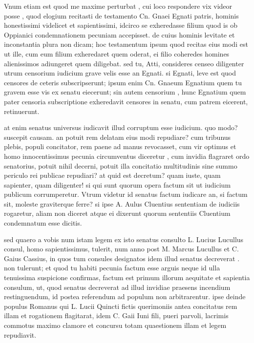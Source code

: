  Vnum etiam est quod me maxime perturbat , cui loco respondere vix videor posse , quod elogium recitasti de testamento Cn. Gnaei Egnati patris, hominis honestissimi videlicet et sapientissimi, idcirco se exheredasse filium quod is ob Oppianici condemnationem pecuniam accepisset. de cuius hominis levitate et inconstantia plura non dicam; hoc testamentum ipsum quod recitas eius modi est ut ille, cum eum filium exheredaret quem oderat, ei filio coheredes homines alienissimos adiungeret quem diligebat. sed tu, Atti, consideres censeo diligenter utrum censorium iudicium grave velis esse an Egnati. si Egnati, leve est quod censores de ceteris subscripserunt; ipsum enim Cn. Gnaeum Egnatium quem tu gravem esse vis ex senatu eiecerunt; sin autem censorium , hunc Egnatium quem pater censoria subscriptione exheredavit censores in senatu, cum patrem eicerent, retinuerunt.

 at enim senatus universus iudicavit illud corruptum esse iudicium. quo modo? suscepit causam. an potuit rem delatam eius modi repudiare? cum tribunus plebis, populi concitator, rem paene ad manus revocasset, cum vir optimus et homo innocentissimus pecunia circumventus diceretur , cum invidia flagraret ordo senatorius, potuit nihil decerni, potuit illa concitatio multitudinis sine summo periculo rei publicae repudiari? at quid est decretum? quam iuste, quam sapienter, quam diligenter! si qui sunt quorum opera factum sit ut iudicium publicum corrumperetur. Vtrum videtur id senatus factum iudicare an, si factum sit, moleste graviterque ferre? si ipse A. Aulus Cluentius sententiam de iudiciis rogaretur, aliam non diceret atque ei dixerunt quorum sententiis Cluentium condemnatum esse dicitis.

 sed quaero a vobis num istam legem ex isto senatus consulto L. Lucius Lucullus consul, homo sapientissimus, tulerit, num anno post M. Marcus Lucullus et C. Gaius Cassius, in quos tum consules designatos idem illud senatus decreverat . non tulerunt; et quod tu habiti pecunia factum esse arguis neque id ulla tenuissima suspicione confirmas, factum est primum illorum aequitate et sapientia consulum, ut, quod senatus decreverat ad illud invidiae praesens incendium restinguendum, id postea referendum ad populum non arbitrarentur. ipse deinde populus Romanus qui L. Lucii Quincti fictis querimoniis antea concitatus rem illam et rogationem flagitarat, idem C. Gaii Iuni fili, pueri parvoli, lacrimis commotus maximo clamore et concursu totam quaestionem illam et legem repudiavit.

